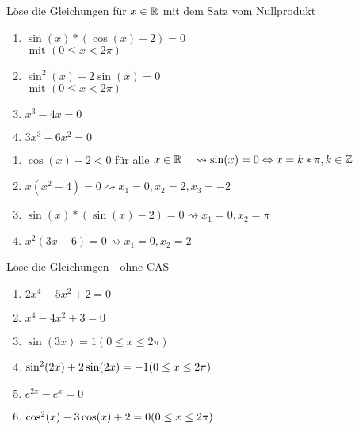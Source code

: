  Löse die Gleichungen für $x\in \mathbb{R}$ mit dem Satz vom Nullprodukt
\begin{multicols}{3}
  \begin{enumerate}
		\item $\sin(x)*(\cos(x)-2)=0$\\ $\text{ mit }(0\leq x<2\pi)$\columnbreak
		\item $\sin^2(x)-2\sin(x) = 0$\\ $\text{ mit }(0\leq x<2\pi)$\columnbreak
    \item $x^3 - 4x = 0$
    \item $3x^3-6x^2=0$
  \end{enumerate}
\end{multicols}

\begin{lsg}{}
  \begin{enumerate}
		\item $\cos(x)-2 < 0$ für alle $x\in \mathbb{R} \quad\rightsquigarrow \sin(x)=0 \Leftrightarrow x=k*\pi, k\in\mathbb{Z}$
    \item $x(x^2-4) = 0 \rightsquigarrow x_1=0, x_2=2, x_3=-2$
    \item $\sin(x)*(\sin(x)-2) = 0 \rightsquigarrow x_1=0, x_2=\pi$
    \item $x^2(3x-6)=0 \rightsquigarrow x_1=0, x_2=2$
  \end{enumerate}
\end{lsg}



 Löse die Gleichungen - ohne CAS
\begin{multicols}{3}
  \begin{enumerate}
    \item $2x^4 - 5x^2 + 2 = 0$
    \item $x^4 - 4x^2 + 3 = 0$
    \item $\sin(3x) = 1 (0\leq x \leq 2\pi)$
    \item $\sin^2(2x) + 2\sin(2x) = -1 \\(0\leq x \leq 2\pi)$
    \item $e^{2x} - e^x = 0$
		\item $\cos^2(x)-3\cos(x)+2=0 \\(0\leq x \leq 2\pi)$
  \end{enumerate}
\end{multicols}

